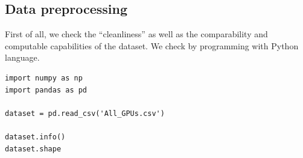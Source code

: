 \documentclass[a4paper]{article}
\begin{document}
\subsection{Data preprocessing}
First of all, we check the “cleanliness” as well as the comparability and computable capabilities of the dataset. We check by programming with Python language. 
\begin{mdframed}[leftline=false,rightline=false,backgroundcolor=lightblue!10,nobreak=false]
    \begin{verbatim}
import numpy as np
import pandas as pd

dataset = pd.read_csv('All_GPUs.csv')

dataset.info()
dataset.shape
    \end{verbatim}
\end{mdframed}
\end{document}
